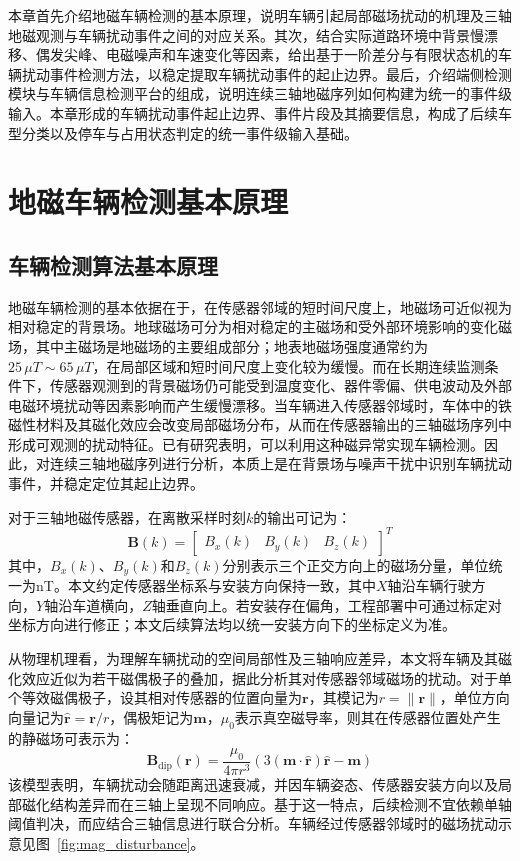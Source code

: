 \documentclass{xdupgthesis}
\begin{document}
本章首先介绍地磁车辆检测的基本原理，说明车辆引起局部磁场扰动的机理及三轴地磁观测与车辆扰动事件之间的对应关系。其次，结合实际道路环境中背景慢漂移、偶发尖峰、电磁噪声和车速变化等因素，给出基于一阶差分与有限状态机的车辆扰动事件检测方法，以稳定提取车辆扰动事件的起止边界。最后，介绍端侧检测模块与车辆信息检测平台的组成，说明连续三轴地磁序列如何构建为统一的事件级输入。本章形成的车辆扰动事件起止边界、事件片段及其摘要信息，构成了后续车型分类以及停车与占用状态判定的统一事件级输入基础。

\section{地磁车辆检测基本原理}
\label{sec:ch2_principle}

\subsection{车辆检测算法基本原理}
\label{sec:ch2_basic}

地磁车辆检测的基本依据在于，在传感器邻域的短时间尺度上，地磁场可近似视为相对稳定的背景场。地球磁场可分为相对稳定的主磁场和受外部环境影响的变化磁场，其中主磁场是地磁场的主要组成部分；地表地磁场强度通常约为 $25\,\mu T \sim 65\,\mu T$，在局部区域和短时间尺度上变化较为缓慢。而在长期连续监测条件下，传感器观测到的背景磁场仍可能受到温度变化、器件零偏、供电波动及外部电磁环境扰动等因素影响而产生缓慢漂移。当车辆进入传感器邻域时，车体中的铁磁性材料及其磁化效应会改变局部磁场分布，从而在传感器输出的三轴磁场序列中形成可观测的扰动特征。已有研究表明，可以利用这种磁异常实现车辆检测\cite{marshall1978vehicle}。因此，对连续三轴地磁序列进行分析，本质上是在背景场与噪声干扰中识别车辆扰动事件，并稳定定位其起止边界。

对于三轴地磁传感器，在离散采样时刻$k$的输出可记为：
\begin{equation}
\mathbf{B}(k)=
\begin{bmatrix}
B_x(k) & B_y(k) & B_z(k)
\end{bmatrix}^{T}
\end{equation}
其中，$B_x(k)$、$B_y(k)$和$B_z(k)$分别表示三个正交方向上的磁场分量，单位统一为nT。本文约定传感器坐标系与安装方向保持一致，其中$X$轴沿车辆行驶方向，$Y$轴沿车道横向，$Z$轴垂直向上。若安装存在偏角，工程部署中可通过标定对坐标方向进行修正；本文后续算法均以统一安装方向下的坐标定义为准。

从物理机理看，为理解车辆扰动的空间局部性及三轴响应差异，本文将车辆及其磁化效应近似为若干磁偶极子的叠加，据此分析其对传感器邻域磁场的扰动。对于单个等效磁偶极子，设其相对传感器的位置向量为$\mathbf{r}$，其模记为$r=\|\mathbf{r}\|$，单位方向向量记为$\hat{\mathbf{r}}=\mathbf{r}/r$，偶极矩记为$\mathbf{m}$，$\mu_0$表示真空磁导率，则其在传感器位置处产生的静磁场可表示为：
\begin{equation}
\mathbf{B}_{\mathrm{dip}}(\mathbf{r})=
\frac{\mu_{0}}{4\pi r^{3}}
\left(3(\mathbf{m}\cdot \hat{\mathbf{r}})\hat{\mathbf{r}}-\mathbf{m}\right)
\end{equation}
该模型表明，车辆扰动会随距离迅速衰减，并因车辆姿态、传感器安装方向以及局部磁化结构差异而在三轴上呈现不同响应。基于这一特点，后续检测不宜依赖单轴阈值判决，而应结合三轴信息进行联合分析\cite{liu2017threeaxis}。车辆经过传感器邻域时的磁场扰动示意见图~\ref{fig:mag_disturbance}。
\end{document}
